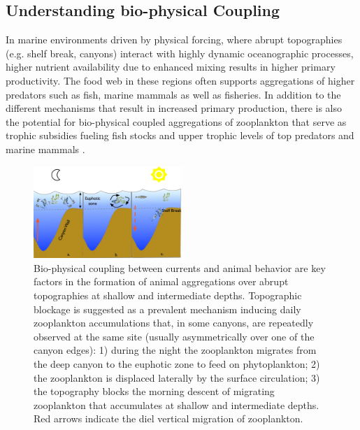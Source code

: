 \subsection{Understanding bio-physical Coupling}

In marine environments driven by physical forcing, where abrupt
topographies (e.g. shelf break, canyons) interact with highly dynamic
oceanographic processes, higher nutrient availability due to enhanced
mixing results in higher primary productivity.  The food web in these
regions often supports aggregations of higher predators such as fish,
marine mammals as well as fisheries. In addition to the different
mechanisms that result in increased primary production, there is also
the potential for bio-physical coupled aggregations of zooplankton
that serve as trophic subsidies fueling fish stocks and upper trophic
levels of top predators and marine mammals \cite{genin04}.

\begin{figure}
  \centering
  \includegraphics[width=0.5\textwidth]{fig/plankton-canyon.jpg}
  \caption{Bio-physical coupling between currents and animal behavior
    are key factors in the formation of animal aggregations over
    abrupt topographies at shallow and intermediate
    depths. Topographic blockage is suggested as a prevalent mechanism
    inducing daily zooplankton accumulations that, in some canyons,
    are repeatedly observed at the same site (usually asymmetrically
    over one of the canyon edges): 1) during the night the zooplankton
    migrates from the deep canyon to the euphotic zone to feed on
    phytoplankton; 2) the zooplankton is displaced laterally by the
    surface circulation; 3) the topography blocks the morning descent
    of migrating zooplankton that accumulates at shallow and
    intermediate depths.  Red arrows indicate the diel vertical
    migration of zooplankton.}
  \label{fig:plankton}
\end{figure}

